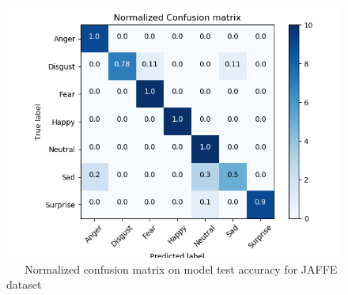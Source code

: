 \documentclass[master]{thesis-uestc}
\begin{document}
\begin{figure}[ht]
\includegraphics[width=5in]{pic/JAFFE_CM_normalized.png}
\caption{\,\,\,\,\,\,\,\,\,\,Normalized confusion matrix on model test accuracy for JAFFE dataset}
\label{fig_jaffe_cm_scores}
\end{figure}
\end{document}
